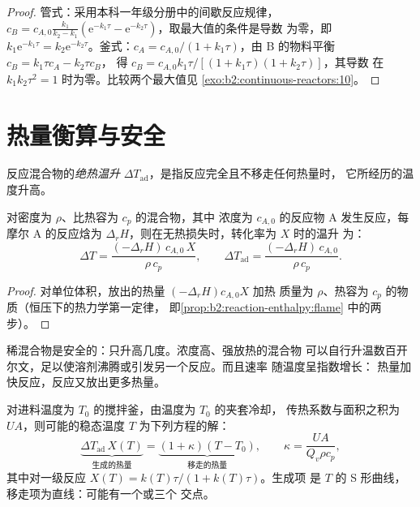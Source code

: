 \begin{proof}
管式：采用本科一年级分册中的间歇反应规律，$c_B = c_{A,0}\frac{k_1}{k_2 - k_1}
(\mathrm e^{-k_1\tau} - \mathrm e^{-k_2\tau})$，取最大值的条件是导数
为零，即 $k_1\mathrm e^{-k_1\tau} = k_2\mathrm e^{-k_2\tau}$。釜式：$c_A =
c_{A,0}/(1 + k_1\tau)$，由 B 的物料平衡 $c_B = k_1\tau c_A - k_2\tau c_B$，
得 $c_B = c_{A,0}k_1\tau/[(1 + k_1\tau)(1 + k_2\tau)]$，其导数
在 $k_1k_2\tau^2 = 1$ 时为零。比较两个最大值见
\cref{exo:b2:continuous-reactors:10}。
\end{proof}

\section{热量衡算与安全}

\begin{definition}[绝热温升]\label{def:b2:continuous-reactors:adiabatic-rise}
反应混合物的\emph{绝热温升}
$\Delta T_{\text{ad}}$，是指反应完全且不移走任何热量时，
它所经历的温度升高。
\end{definition}

\begin{proposition}[液体混合物的绝热温升]\label{prop:b2:continuous-reactors:adiabatic}
对密度为 $\rho$、比热容为 $c_p$ 的混合物，其中
浓度为 $c_{A,0}$ 的反应物 A 发生反应，每摩尔 A 的反应焓为
$\Delta_r H$，则在无热损失时，转化率为 $X$ 时的温升
为：
\[
  \Delta T = \frac{(-\Delta_r H)\,c_{A,0}\,X}{\rho\,c_p}, \qquad
  \Delta T_{\text{ad}} = \frac{(-\Delta_r H)\,c_{A,0}}{\rho\,c_p} .
\]
\end{proposition}

\begin{proof}
对单位体积，放出的热量 $(-\Delta_r H)c_{A,0}X$ 加热
质量为 $\rho$、热容为 $c_p$ 的物质（恒压下的热力学第一定律，
即\cref{prop:b2:reaction-enthalpy:flame} 中的两步）。
\end{proof}

稀混合物是安全的：只升高几度。浓度高、强放热的混合物
可以自行升温数百开尔文，足以使溶剂沸腾或引发另一个反应。而且速率
随温度呈指数增长：
热量加快反应，反应又放出更多热量。

\begin{proposition}[冷却搅拌釜的稳态]\label{prop:b2:continuous-reactors:steady-states}
对进料温度为 $T_0$ 的搅拌釜，由温度为 $T_0$ 的夹套冷却，
传热系数与面积之积为 $UA$，则可能的稳态温度
$T$ 为下列方程的解：
\[
  \underbrace{\Delta T_{\text{ad}}\,X(T)}_{\text{生成的热量}} =
  \underbrace{(1 + \kappa)(T - T_0)}_{\text{移走的热量}}, \qquad
  \kappa = \frac{UA}{Q_v\rho c_p},
\]
其中对一级反应 $X(T) = k(T)\tau/(1 + k(T)\tau)$。生成项
是 $T$ 的 S 形曲线，移走项为直线：可能有一个或三个
交点。
\end{proposition}

